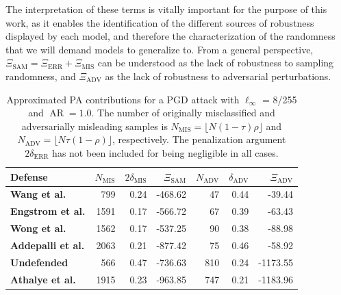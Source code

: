 The interpretation of these terms is vitally important for the purpose of this work, as it enables
the identification of the different sources of robustness displayed by each model, and therefore
the characterization of the randomness that we will demand models to generalize to. From a general 
perspective, $\Xi_{\text{SAM}} = \Xi_{\text{ERR}} + \Xi_{\text{MIS}}$ can be understood as the lack of robustness
to sampling randomness, and $\Xi_{\text{ADV}}$ as the lack of robustness to adversarial perturbations. \\


\begin{table}[H]
    \centering
    \begin{tabular}{l|rrr|rrr}
    Defense & $N_{\text{MIS}}$ & $2 \delta_{\text{MIS}}$ & $\Xi_{\text{SAM}}$ & $N_{\text{ADV}}$ & $\delta_{\text{ADV}}$ & $\Xi_{\text{ADV}}$ \\
    \midrule
    {\color{tab:brown} \textbf{Wang et al.}} & 799 & 0.24 & -468.62 & 47 & 0.44 & -39.44 \\
    {\color{tab:blue} \textbf{Engstrom et al.}} & 1591 & 0.17 & -566.72 & 67 & 0.39 & -63.43 \\
    {\color{tab:red} \textbf{Wong et al.}} & 1562 & 0.17 & -537.25 & 90 & 0.38 & -88.98 \\
    {\color{tab:purple} \textbf{Addepalli et al.}} & 2063 & 0.21 & -877.42 & 75 & 0.46 & -58.92 \\
    {\color{tab:orange} \textbf{Undefended}} & 566 & 0.47 & -736.63 & 810 & 0.24 & -1173.55 \\
    {\color{tab:green} \textbf{Athalye et al.}} & 1915 & 0.23 & -963.85 & 747 & 0.21 & -1183.96 \\
    \bottomrule
    \end{tabular}
    \caption{
    Approximated PA contributions for a PGD attack with $\ell_\infty$ = 8/255 and
    $\operatorname{AR} = 1.0$. The number of originally misclassified and adversarially misleading
    samples is $N_{\text{MIS}} = \lfloor N (1-\tau) \rho \rfloor$ and
    $N_{\text{ADV}} = \lfloor N \tau (1-\rho) \rfloor$, respectively. 
    The penalization argument $2 \delta_{\text{ERR}}$ has not
    been included for being negligible in all cases.
    }
    \label{tab:approx_pa_pgd_table}
\end{table}

